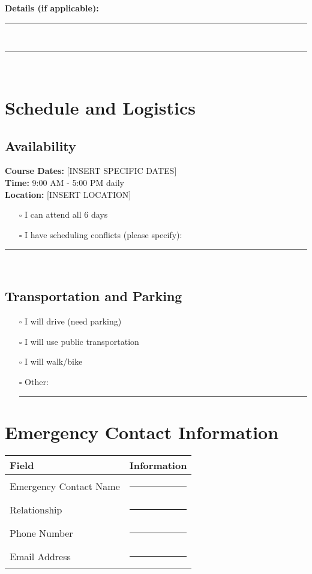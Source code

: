 \documentclass[11pt,a4paper]{article}
\begin{document}
\textbf{Details (if applicable):}\\
\rule{\textwidth}{0.4pt}\\[0.3cm]
\rule{\textwidth}{0.4pt}\\[0.3cm]

\section{Schedule and Logistics}

\subsection{Availability}
\textbf{Course Dates:} [INSERT SPECIFIC DATES]\\
\textbf{Time:} 9:00 AM - 5:00 PM daily\\
\textbf{Location:} [INSERT LOCATION]

\begin{itemize}[leftmargin=0.5cm]
    \item[$\square$] I can attend all 6 days
    \item[$\square$] I have scheduling conflicts (please specify):
\end{itemize}

\rule{\textwidth}{0.4pt}\\[0.3cm]

\subsection{Transportation and Parking}
\begin{itemize}[leftmargin=0.5cm]
    \item[$\square$] I will drive (need parking)
    \item[$\square$] I will use public transportation
    \item[$\square$] I will walk/bike
    \item[$\square$] Other: \rule{3cm}{0.4pt}
\end{itemize}

\section{Emergency Contact Information}

\begin{tabular}{|p{4cm}|p{10cm}|}
\hline
\rowcolor{formgray}
\textbf{Field} & \textbf{Information} \\
\hline
Emergency Contact Name & \rule{8cm}{0.4pt} \\
\hline
Relationship & \rule{8cm}{0.4pt} \\
\hline
Phone Number & \rule{8cm}{0.4pt} \\
\hline
Email Address & \rule{8cm}{0.4pt} \\
\hline
\end{tabular}
\end{document}
